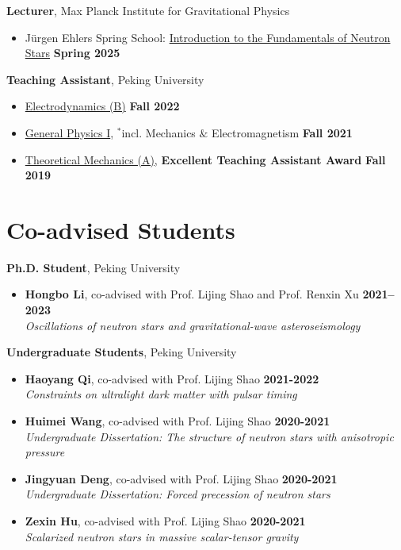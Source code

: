 \documentclass[margin,line]{res}
\begin{document}
\begin{resume}
{\bf Lecturer}, Max Planck Institute for Gravitational Physics 
\vspace*{.05in}
\begin{itemize}
  \item[ ] Jürgen Ehlers Spring School: \href{https://springschool.aei.mpg.de/}{Introduction to the Fundamentals of Neutron Stars} \hfill {\bf Spring 2025}
\end{itemize}


{\bf Teaching Assistant}, Peking University
\vspace*{.05in}
\begin{itemize}
  \item[ ] \href{http://friendshao.github.io/teaching/ced22/}{Electrodynamics (B)} \hfill {\bf Fall 2022}
\item[ ] \href{http://friendshao.github.io/teaching/phy21/}{General Physics I}, $^{*}${\small incl. Mechanics $\&$ Electromagnetism} \hfill {\bf Fall 2021}
\item[ ] \href{http://friendshao.github.io/teaching/thmech19/}{Theoretical Mechanics (A)}, {\small{\bf Excellent Teaching Assistant Award}} \hfill {\bf Fall 2019}
\end{itemize}

\section{\sc Co-advised Students}

{\bf Ph.D. Student}, Peking University
\vspace*{.05in}
\begin{itemize}
\item[] {\bf Hongbo Li}, co-advised with Prof. Lijing Shao and Prof. Renxin Xu 
\hfill {\bf 2021--2023} \\
\vspace*{.05in}
{\it  Oscillations of neutron stars and gravitational-wave asteroseismology}
\end{itemize}
{\bf Undergraduate Students}, Peking University
\vspace*{.05in}
\begin{itemize}
\item[] {\bf Haoyang Qi}, co-advised with Prof. Lijing Shao
\hfill {\bf 2021-2022}\\
{\it Constraints on ultralight dark matter with pulsar timing}
\item[] {\bf Huimei Wang}, co-advised with Prof. Lijing Shao 
\hfill {\bf 2020-2021}\\
{\it Undergraduate Dissertation: The structure of neutron stars with anisotropic pressure}
\item[] {\bf Jingyuan Deng}, co-advised with Prof. Lijing Shao 
\hfill {\bf 2020-2021}\\
{\it Undergraduate Dissertation: Forced precession of neutron stars}
\item[] {\bf Zexin Hu}, co-advised with Prof. Lijing Shao
\hfill {\bf 2020-2021}\\
{\it Scalarized neutron stars in massive scalar-tensor gravity}
\end{itemize}


\end{resume}
\end{document}
